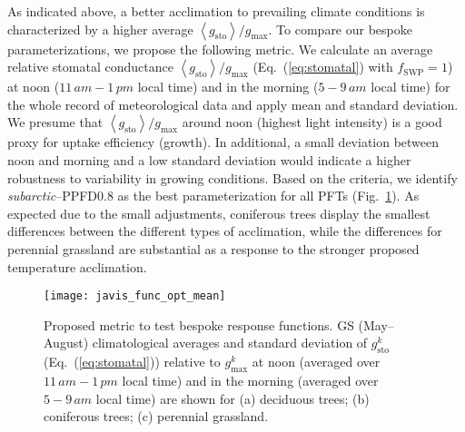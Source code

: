 \documentclass[bg, manuscript]{copernicus}
\begin{document}
As indicated above, a better acclimation to prevailing climate conditions is characterized by a higher average $\left<g_\mathrm{sto}\right>/g_\mathrm{max}$. To compare our bespoke parameterizations, we propose the following metric. We calculate an average relative stomatal conductance $\left<g_\mathrm{sto}\right>/g_\mathrm{max}$ (Eq.~(\ref{eq:stomatal}) with $f_\mathrm{SWP}=1$) at noon ($11\,\unit{am}-1\,\unit{pm}$ local time) and in the morning ($5-9\,\unit{am}$ local time) for the whole record of meteorological data and apply mean and standard deviation. We presume that $\left<g_\mathrm{sto}\right>/g_\mathrm{max}$ around noon (highest light intensity) is a good proxy for  uptake efficiency (growth). In additional, a small deviation between noon and morning and a low standard deviation would indicate a higher robustness to variability in growing conditions. Based on the criteria, we identify \emph{subarctic}--PPFD0.8 as the best parameterization for all PFTs (Fig.~\ref{fig:javis_func_opt_mean}). As expected due to the small adjustments, coniferous trees display the smallest differences between the different types of acclimation, while the differences for perennial grassland are substantial as a response to the stronger proposed temperature acclimation.

\begin{figure}[t]
  \texttt{[image: javis\_func\_opt\_mean]}
  \caption{Proposed metric to test bespoke response functions. GS (May--August) climatological averages and standard deviation of $g_\mathrm{sto}^k$ (Eq.~(\ref{eq:stomatal})) relative to $g_\mathrm{max}^k$ at noon (averaged over $11\,\unit{am}-1\,\unit{pm}$ local time) and in the morning (averaged over $5-9\,\unit{am}$ local time) are shown for (a) deciduous trees; (b) coniferous trees; (c) perennial grassland. }
  \label{fig:javis_func_opt_mean}
\end{figure}
\end{document}
